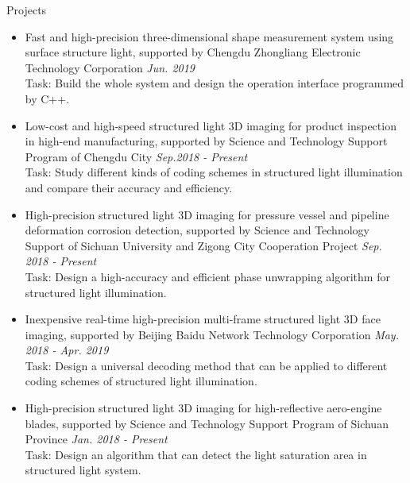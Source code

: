 \documentclass{resume} %
\begin{document}
\begin{rSection}{Projects}
	\begin{itemize}[leftmargin=*]
		\item Fast and high-precision three-dimensional shape measurement system using surface structure light, supported by Chengdu Zhongliang Electronic Technology Corporation \hfill{\em Jun. 2019}\vspace{1.5mm}\\	
		Task: Build the whole system and design the operation interface programmed by C++.
		
		\item  Low-cost and high-speed structured light 3D imaging for product inspection in high-end manufacturing, supported by Science and Technology Support Program of Chengdu City 
		\hfill {\em Sep.2018 - Present}\vspace{1.5mm}\\
		Task: Study different kinds of coding schemes in structured light illumination and compare their accuracy and efficiency.
		
		\item  High-precision structured light 3D imaging for pressure vessel and pipeline deformation corrosion detection, supported by Science and Technology Support of Sichuan University and Zigong City Cooperation Project \hfill {\em Sep. 2018 - Present}\vspace{1.5mm}\\
		Task: Design a high-accuracy and efficient phase unwrapping algorithm for structured light illumination.
		
		\item  Inexpensive real-time high-precision multi-frame structured light 3D face imaging, supported by Beijing Baidu Network Technology Corporation 
		\hfill {\em May. 2018 - Apr. 2019}\vspace{1.5mm}\\
		Task: Design a universal decoding method that can be applied to different coding schemes of structured light illumination.
				
		\item  High-precision structured light 3D imaging for high-reflective aero-engine blades, supported by Science and Technology Support Program of Sichuan Province 
		\hfill {\em Jan. 2018 - Present}\vspace{1.5mm}\\
		Task: Design an algorithm that can detect the light saturation area in structured light system.
		

\end{itemize}
\end{rSection}
\end{document}
